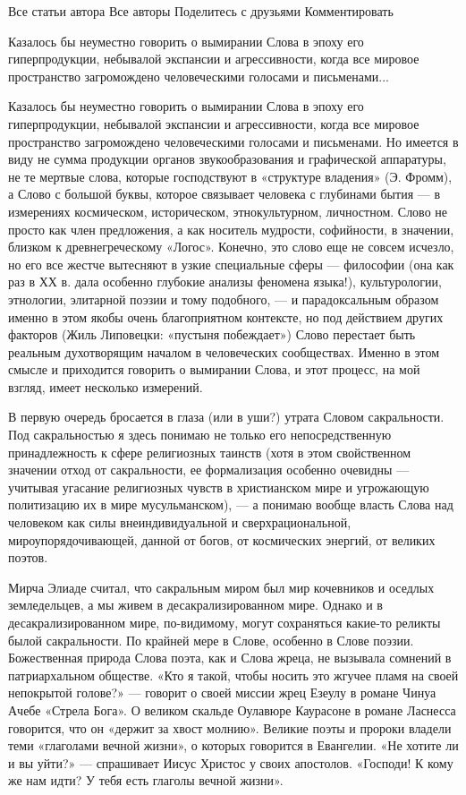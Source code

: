 Все статьи автора
Все авторы
Поделитесь с друзьями
Комментировать

Казалось бы неуместно говорить о вымирании Слова в эпоху его гиперпродукции, небывалой экспансии и агрессивности, когда все мировое пространство загромождено человеческими голосами и письменами...

Казалось бы неуместно говорить о вымирании Слова в эпоху его гиперпродукции, небывалой экспансии и агрессивности, когда все мировое пространство загромождено человеческими голосами и письменами. Но имеется в виду не сумма продукции органов звукообразования и графической аппаратуры, не те мертвые слова, которые господствуют в «структуре владения»
(Э. Фромм), а Слово с большой буквы, которое связывает человека с глубинами бытия — в измерениях космическом, историческом, этнокультурном, личностном. Слово не просто как член предложения, а как носитель мудрости, софийности, в значении, близком к древнегреческому «Логос». Конечно, это слово еще не совсем исчезло, но его все жестче вытесняют в узкие специальные сферы — философии (она как раз в ХХ в. дала особенно глубокие анализы феномена языка!), культурологии, этнологии, элитарной поэзии и тому подобного, — и парадоксальным образом именно в этом якобы очень благоприятном контексте, но под действием других факторов (Жиль Липовецки: «пустыня побеждает») Слово перестает быть реальным духотворящим началом в человеческих сообществах. Именно в этом смысле и приходится говорить о вымирании Слова, и этот процесс, на мой взгляд, имеет несколько измерений.

В первую очередь бросается в глаза (или в уши?) утрата Словом сакральности. Под сакральностью я здесь понимаю не только его непосредственную принадлежность к сфере религиозных таинств (хотя в этом свойственном значении отход от сакральности, ее формализация особенно очевидны — учитывая угасание религиозных чувств в христианском мире и угрожающую политизацию их в мире мусульманском), — а понимаю вообще власть Слова над человеком как силы внеиндивидуальной и сверхрациональной, мироупорядочивающей, данной от богов, от космических энергий, от великих поэтов.

Мирча Элиаде считал, что сакральным миром был мир кочевников и оседлых земледельцев, а мы живем в десакрализированном мире. Однако и в десакрализированном мире, по-видимому, могут сохраняться какие-то реликты былой сакральности. По крайней мере в Слове, особенно в Слове поэзии. Божественная природа Слова поэта, как и Слова жреца, не вызывала сомнений в патриархальном обществе. «Кто я такой, чтобы носить это жгучее пламя на своей непокрытой голове?» — говорит о своей миссии жрец Езеулу в романе Чинуа Ачебе «Стрела Бога». О великом скальде Оулавюре Каурасоне в романе Ласнесса говорится, что он «держит за хвост молнию». Великие поэты и пророки владели теми «глаголами вечной жизни», о которых говорится в Евангелии. «Не хотите ли и вы уйти?» — спрашивает Иисус Христос у своих апостолов. «Господи! К кому же нам идти? У тебя есть глаголы вечной жизни».

